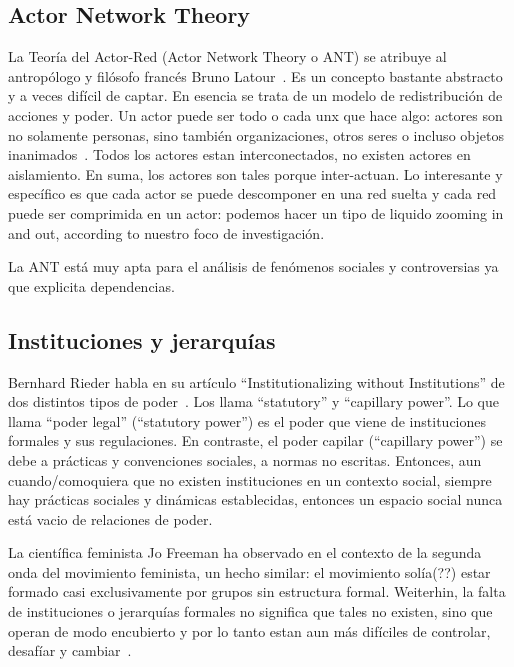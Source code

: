 \subsection{Actor Network Theory}

La Teoría del Actor-Red (Actor Network Theory o ANT) se atribuye al antropólogo y filósofo francés Bruno Latour~\autocite{Latour2010}.
Es un concepto bastante abstracto y a veces difícil de captar.
En esencia se trata de un modelo de redistribución de acciones y poder.
Un actor puede ser todo o cada unx que hace algo: actores son no solamente personas, sino también organizaciones, otros seres o incluso objetos inanimados~\autocite{Venturini2010b}.
Todos los actores estan interconectados, no existen actores en aislamiento.
En suma, los actores son tales porque inter-actuan.
Lo interesante y específico es que cada actor se puede descomponer en una red suelta y cada red puede ser comprimida en un actor:
podemos hacer un tipo de liquido zooming in and out, according to nuestro foco de investigación.

La ANT está muy apta para el análisis de fenómenos sociales y controversias ya que explicita dependencias.


\subsection{Instituciones y jerarquías}

Bernhard Rieder habla en su artículo ``Institutionalizing without Institutions'' de dos distintos tipos de poder~\autocite{Rieder2012}.
Los llama ``statutory'' y ``capillary power''.
Lo que llama ``poder legal'' (``statutory power'') es el poder que viene de instituciones formales y sus regulaciones.
En contraste, el poder capilar (``capillary power'') se debe a prácticas y convenciones sociales, a normas no escritas.
Entonces, aun cuando/comoquiera que no existen instituciones en un contexto social, siempre hay prácticas sociales y dinámicas establecidas, entonces un espacio social nunca está vacio de relaciones de poder.

La científica feminista Jo Freeman ha observado en el contexto de la segunda onda del movimiento feminista, un hecho similar:
el movimiento solía(??) estar formado casi exclusivamente por grupos sin estructura formal.
Weiterhin, la falta de instituciones o jerarquías formales no significa que tales no existen, sino que operan de modo encubierto y por lo tanto estan aun más difíciles de controlar, desafíar y cambiar~\autocite{Freeman1970}.

